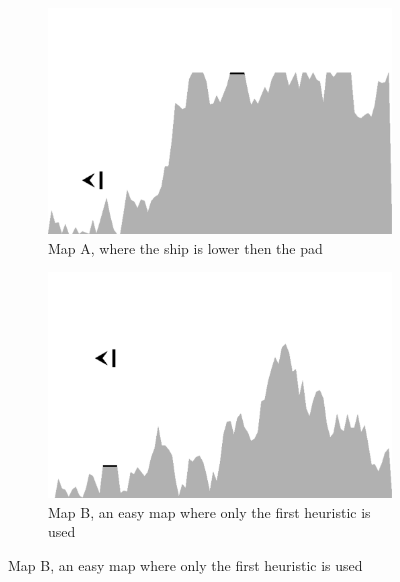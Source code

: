 \documentclass[conference]{IEEEtran}
\begin{document}


\begin{figure}[ht]
  \centering



  \centering
        \begin{subfigure}{0.49\textwidth}
                \centering
                \includegraphics[width=1.0\textwidth]{./graphics/map2.pdf}
                \caption{Map A,  where the ship is lower then the pad}
                \label{fig:map2}
        \end{subfigure}  
        \begin{subfigure}{0.49\textwidth}
                \centering
                \includegraphics[width=1.0\textwidth]{./graphics/map1-easy.pdf}
                \caption{Map B, an easy map where only the first heuristic is used}
                \label{fig:map1-easy}


\end{subfigure}
\end{figure}
\end{document}
